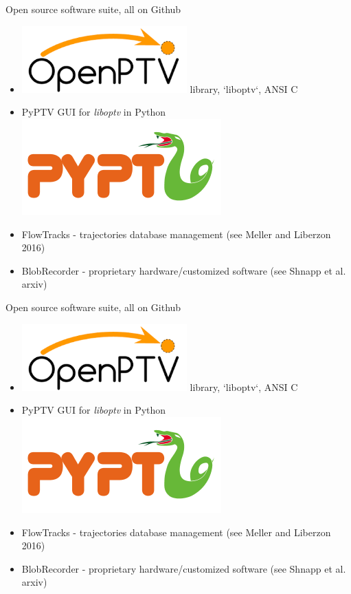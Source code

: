 \documentclass[aspectratio=43]{beamer}
\begin{document}
\begin{frame}{Open source software suite, all on Github}
\begin{itemize}
\item \includegraphics[width=0.5\textwidth]{openptv} \hspace{1em} library, `liboptv`, ANSI C
\item PyPTV GUI for {\em liboptv} in Python \includegraphics[width=.3\textwidth]{pyptv}
\item FlowTracks - trajectories database management (see Meller and Liberzon 2016)
\item BlobRecorder - proprietary hardware/customized software (see Shnapp et al. arxiv)
\end{itemize}
\end{frame}

	 

\begin{frame}[label=opensource-1]{Open source software suite, all on Github}
\begin{itemize}
\item \includegraphics[width=0.5\textwidth]{openptv} \hspace{1em} library, `liboptv`, ANSI C
\item PyPTV GUI for {\em liboptv} in Python \includegraphics[width=.3\textwidth]{pyptv}
\item FlowTracks - trajectories database management (see Meller and Liberzon 2016)
\item BlobRecorder - proprietary hardware/customized software (see Shnapp et al. arxiv)
\end{itemize}
\end{frame}
\end{document}
